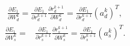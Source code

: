 \documentclass{article}
\begin{document}
\begin{equation}
	\begin{aligned}
	\frac{\partial E_1 }{\partial W_d^k} =\frac{\partial E_1 }{\partial r_{d}^{k+1}}\frac{\partial r_{d}^{k+1}}{\partial W_d^k} = \frac{\partial E_1 }{\partial r_{d}^{k+1}}(a_d^k)^{T},  
	\end{aligned}
	\label{eq7}
\end{equation}
\begin{equation}
	\begin{aligned}
	\frac{\partial E_1 }{\partial W_s^k} =&\frac{\partial E_1 }{\partial r_{s}^{k+1}}\frac{\partial r_{s}^{k+1}}{\partial W_s^k}=\frac{\partial E_1 }{\partial r_{s}^{k+1}}(a_s^k)^{T}.   
	\end{aligned}
\label{eq8}
\end{equation}
\\
\end{document}

